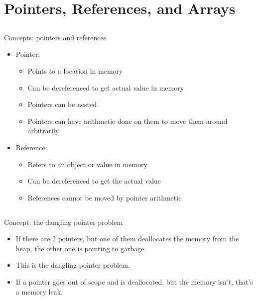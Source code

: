 \section{Pointers, References, and Arrays}\label{sec:Pointers}


\subsection{}
Concepts: pointers and references

\begin{itemize}
\item Pointer:
  \begin{itemize}[noitemsep]
  \item Points to a location in memory
  \item Can be dereferenced to get actual value in memory
  \item Pointers can be nested
  \item Pointers can have arithmetic done on them to move them around arbitrarily
  \end{itemize}

\item Reference:
  \begin{itemize}[noitemsep]
  \item Refers to an object or value in memory
  \item Can be dereferenced to get the actual value
  \item References cannot be moved by pointer arithmetic
  \end{itemize}
\end{itemize}

\subsection{}
Concept: the dangling pointer problem

\begin{itemize}[noitemsep]
\item If there are 2 pointers, but one of them deallocates the memory from the heap, the other one is pointing to garbage.
\item This is the dangling pointer problem.
\end{itemize}

\begin{itemize}[noitemsep]
\item If a pointer goes out of scope and is deallocated, but the memory isn't, that's a memory leak.
\end{itemize}

